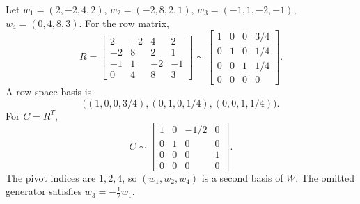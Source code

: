 \begin{enumerate}[label=\alph*)]
\begin{answer}
Let $w_1=(2,-2,4,2)$, $w_2=(-2,8,2,1)$,
$w_3=(-1,1,-2,-1)$, $w_4=(0,4,8,3)$. For the row matrix,
\[
 R=\begin{bmatrix}2&-2&4&2\\-2&8&2&1\\-1&1&-2&-1\\0&4&8&3\end{bmatrix}
 \sim\begin{bmatrix}1&0&0&3/4\\0&1&0&1/4\\0&0&1&1/4\\0&0&0&0\end{bmatrix}.
\]
A row-space basis is
\[
 \bigl((1,0,0,3/4),(0,1,0,1/4),(0,0,1,1/4)\bigr).
\]
For $C=R^T$,
\[
 C\sim\begin{bmatrix}1&0&-1/2&0\\0&1&0&0\\0&0&0&1\\0&0&0&0\end{bmatrix}.
\]
The pivot indices are $1,2,4$, so $(w_1,w_2,w_4)$ is a second basis of $W$.
The omitted generator satisfies $w_3=-\frac12w_1$.
\end{answer}
\end{enumerate}
